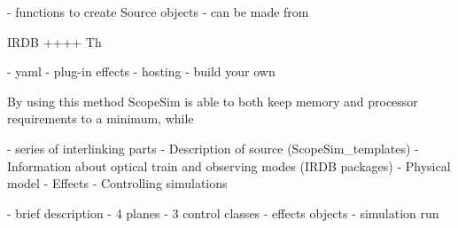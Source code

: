 - functions to create Source objects
- can be made from




IRDB
++++
Th


- yaml
- plug-in effects
- hosting
- build your own





By using this method ScopeSim is able to
both keep memory and processor requirements to a minimum, while









- series of interlinking parts
    - Description of source (ScopeSim_templates)
    - Information about optical train and observing modes (IRDB packages)
    - Physical model
    - Effects
    - Controlling simulations










- brief description
- 4 planes
- 3 control classes
- effects objects
- simulation run



























